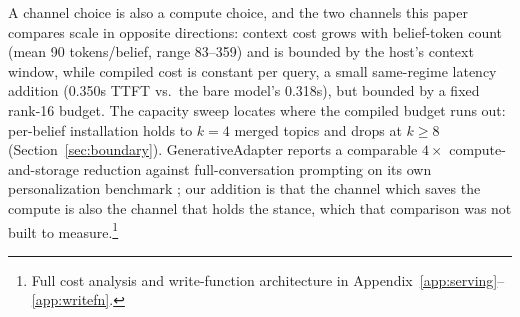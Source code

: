 A channel choice is also a compute choice, and the two channels this paper compares
scale in opposite directions: context cost grows with belief-token count (mean 90
tokens/belief, range 83--359) and is bounded by the host's context window, while
compiled cost is constant per query, a small same-regime latency addition (0.350s TTFT
vs.\ the bare model's 0.318s), but bounded by a fixed rank-16 budget. The capacity
sweep locates where the compiled budget runs out: per-belief installation holds to
\(k=4\) merged topics and drops at \(k \ge 8\) (Section~\ref{sec:boundary}).
GenerativeAdapter reports a comparable $4\times$ compute-and-storage reduction against
full-conversation prompting on its own personalization benchmark
\citep{chen2025generativeadapter}; our addition is that the channel which saves the
compute is also the channel that holds the stance, which that comparison was not built
to measure.\footnote{Full cost analysis and write-function architecture in
Appendix~\ref{app:serving}--\ref{app:writefn}.}
